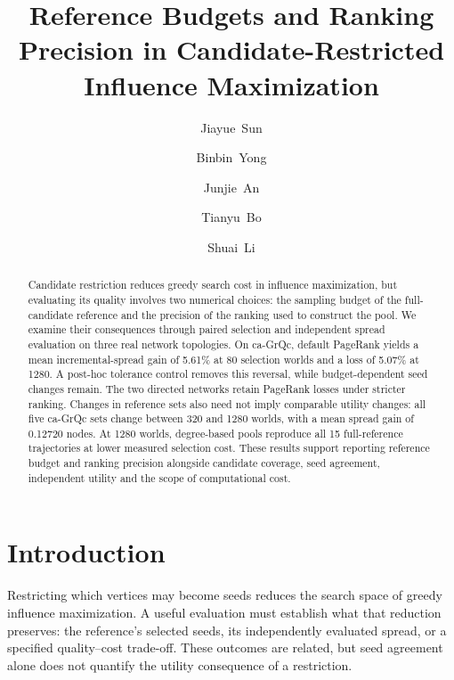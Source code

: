 \documentclass[smallextended]{svjour3}
\begin{document}
\title{Reference Budgets and Ranking Precision in Candidate-Restricted Influence Maximization}
\author{\mbox{Jiayue Sun} \and \mbox{Binbin Yong} \and \mbox{Junjie An} \and \mbox{Tianyu Bo} \and \mbox{Shuai Li}}
\date{}
\maketitle
\begin{abstract}
Candidate restriction reduces greedy search cost in influence maximization, but evaluating its quality involves two numerical choices: the sampling budget of the full-candidate reference and the precision of the ranking used to construct the pool. We examine their consequences through paired selection and independent spread evaluation on three real network topologies. On ca-GrQc, default PageRank yields a mean incremental-spread gain of 5.61\% at 80 selection worlds and a loss of 5.07\% at 1280. A post-hoc tolerance control removes this reversal, while budget-dependent seed changes remain. The two directed networks retain PageRank losses under stricter ranking. Changes in reference sets also need not imply comparable utility changes: all five ca-GrQc sets change between 320 and 1280 worlds, with a mean spread gain of 0.12720 nodes. At 1280 worlds, degree-based pools reproduce all 15 full-reference trajectories at lower measured selection cost. These results support reporting reference budget and ranking precision alongside candidate coverage, seed agreement, independent utility and the scope of computational cost.
\end{abstract}

\section{Introduction}
Restricting which vertices may become seeds reduces the search space of greedy influence maximization. A useful evaluation must establish what that reduction preserves: the reference's selected seeds, its independently evaluated spread, or a specified quality--cost trade-off. These outcomes are related, but seed agreement alone does not quantify the utility consequence of a restriction.
\end{document}
